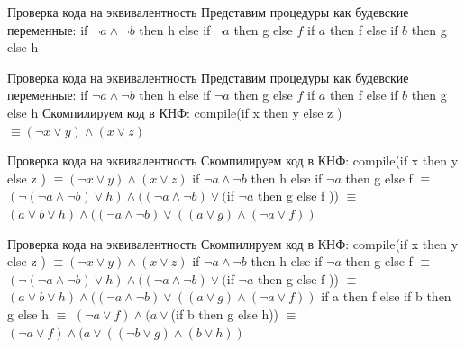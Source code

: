 \documentclass{beamer}
\begin{document}
\begin{frame}{Проверка кода на эквивалентность}
Представим процедуры как будевские переменные:\newline
if $\lnot a \wedge \lnot b$ then h\newline
else if $\lnot a$ then g\newline
else $f$\newline
\newline
if $a$ then f\newline
else if $b$ then g\newline
else h
\end{frame}

\begin{frame}{Проверка кода на эквивалентность}
Представим процедуры как будевские переменные:\newline
if $\lnot a \wedge \lnot b$ then h\newline
else if $\lnot a$ then g\newline
else $f$\newline
\newline
if $a$ then f\newline
else if $b$ then g\newline
else h\newline
Скомпилируем код в КНФ:\newline
compile(if x then y else z ) $\equiv (\lnot x \vee y) \wedge (x \vee z)$
\end{frame}

\begin{frame}{Проверка кода на эквивалентность}
Скомпилируем код в КНФ:\newline
compile(if x then y else z ) $\equiv (\lnot x \vee y) \wedge (x \vee z)$\newline
if $\lnot a \wedge \lnot b$ then h else if $\lnot a$ then g else f $\equiv$\newline
$(\lnot(\lnot a \wedge \lnot b) \vee h) \wedge ((\lnot a \wedge \lnot b) \vee ($if $\lnot a$ then g else f )) $\equiv$\newline
$(a \vee b \vee h) \wedge ((\lnot a \wedge \lnot b) \vee ((a \vee g ) \wedge (\lnot a \vee f ))$
\end{frame}

\begin{frame}{Проверка кода на эквивалентность}
Скомпилируем код в КНФ:\newline
compile(if x then y else z ) $\equiv (\lnot x \vee y) \wedge (x \vee z)$\newline
if $\lnot a \wedge \lnot b$ then h else if $\lnot a$ then g else f $\equiv$\newline
$(\lnot(\lnot a \wedge \lnot b) \vee h) \wedge ((\lnot a \wedge \lnot b) \vee ($if $\lnot a$ then g else f )) $\equiv$\newline
$(a \vee b \vee h) \wedge ((\lnot a \wedge \lnot b) \vee ((a \vee g ) \wedge (\lnot a \vee f ))$
\newline
if a then f else if b then g else h $\equiv$\newline
$(\lnot a \vee f) \wedge (a \vee$(if b then g else h)) $\equiv$\newline
$(\lnot a \vee f) \wedge (a \vee((\lnot b \vee g) \wedge (b \vee h))$
\end{frame}
\end{document}
